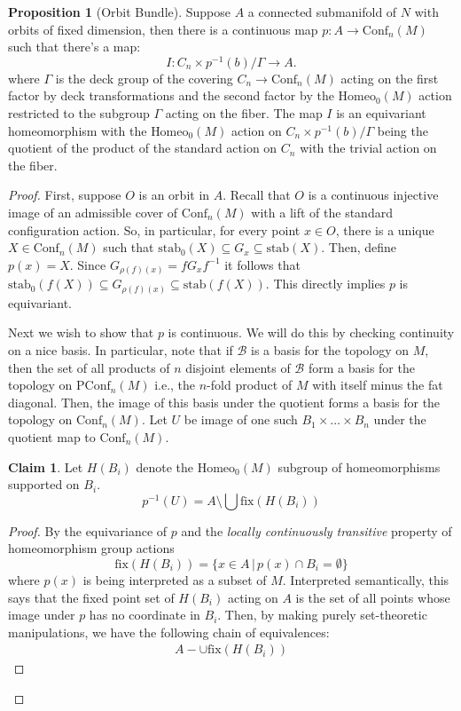 \documentclass[10pt, oneside]{article}
\newcommand{\homeo}[1][S^1]{\text{Homeo}_0(#1)}
\newcommand{\conf}[2][S^1]{\text{Conf}_{#2}(#1)}
\newcommand{\pconf}[2][S^1]{\text{PConf}_{#2}(#1)}
\theoremstyle{definition}
\newtheorem{prop}{Proposition}[section]
\newtheorem*{clm*}{Claim}
\theoremstyle{definition}
\begin{document}
\begin{prop}[Orbit Bundle]
    Suppose $A$ a connected submanifold of $N$ 
    with orbits of fixed dimension, 
    then there is a continuous map $p: A\to \conf[M]{n}$ 
    such that there's a map: $$I: C_n \times p^{-1}(b) / \Gamma \to A.$$
    where $\Gamma$ is the deck group of the covering $C_n \to \conf[M]{n}$ 
    acting on the first factor by deck transformations 
    and the second factor by the $\homeo[M]$ action 
    restricted to the subgroup $\Gamma$ acting on the fiber.
    The map $I$ is an equivariant homeomorphism 
    with the $\homeo[M]$ action on $C_n \times p^{-1}(b) / \Gamma$ being the quotient of the product of the standard action on $C_n$ 
    with the trivial action on the fiber.
\end{prop}
\begin{proof}
    First, 
    suppose $O$ is an orbit in $A$. 
    Recall that $O$ is a continuous injective image 
    of an admissible cover of $\conf[M]{n}$ 
    with a lift of the standard configuration action. 
    So, in particular, 
    for every point $x\in O$, 
    there is a unique $X\in\conf[M]{n}$ 
    such that $\text{stab}_0(X) \subseteq G_x \subseteq \text{stab}(X)$. 
    Then, define $p(x) = X$. 
    Since $G_{\rho(f)(x)} = f G_x f^{-1}$ 
    it follows that $\text{stab}_0(f(X)) \subseteq G_{\rho(f)(x)}\subseteq \text{stab}(f(X))$. 
    This directly implies $p$ is equivariant. 

    Next we wish to show that $p$ is continuous.
    We will do this by checking continuity on a nice basis. 
    In particular, 
    note that if $\mathscr{B}$ is a basis for the topology on $M$, 
    then the set of all products of $n$ disjoint elements of $\mathscr{B}$ form a basis for the topology on $\pconf[M]{n}$ 
    i.e., the $n$-fold product of $M$ with itself minus the fat diagonal. 
    Then, the image of this basis under the quotient forms a basis for the topology on $\conf[M]{n}$.
    Let $U$ be image of one such $B_1\times\dots\times B_n$ 
    under the quotient map to $\conf[M]{n}$. 

    \begin{clm*}
        Let $H(B_i)$ denote the $\homeo[M]$ subgroup of homeomorphisms supported on $B_i$.
        $$p^{-1}(U) = A \setminus \bigcup \text{fix}(H(B_i))$$
    \end{clm*}
    \begin{proof}
        By the equivariance of $p$ 
        and the \textit{locally continuously transitive} property of homeomorphism group actions
        $$\text{fix}(H(B_i)) = \{x\in A\, |\, p(x)\cap B_i = \emptyset\}$$
        where $p(x)$ is being interpreted as a subset of $M$. Interpreted semantically, 
        this says that 
        the fixed point set of $H(B_i)$ acting on $A$ is 
        the set of all points whose image under $p$ has no coordinate in $B_i$. 
        Then, by making purely set-theoretic manipulations, 
        we have the following chain of equivalences:
        \begin{align*}
            A - \cup\text{fix}(H(B_i))
        \end{align*}
    \end{proof}
    
\end{proof}
\end{document}
